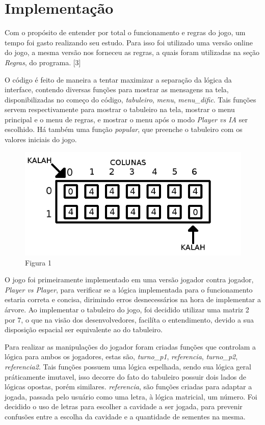 \documentclass[a4paper, 12pt]{article}
\begin{document}
		
	\section{Implementação}
		\textrm{Com o propósito de entender por total o funcionamento e regras do jogo, um tempo foi gasto realizando seu estudo. Para isso foi utilizado uma versão online do jogo, a mesma versão nos forneceu as regras, a quais foram utilizadas na seção \emph{Regras}, do programa. [3]}
		
		\textrm{O código é feito de maneira a tentar maximizar a separação da lógica da interface, contendo diversas funções para mostrar as mensagens na tela, disponibilizadas no começo do código, \emph{tabuleiro}, \emph{menu}, \emph{menu_dific}. Tais funções servem respectivamente para mostrar o tabuleiro na tela, mostrar o menu principal e o menu de regras, e mostrar o menu após o modo \emph{Player vs IA} ser escolhido. Há também uma função \emph{popular}, que preenche o tabuleiro com os valores iniciais do jogo.}

		\begin{figure}[H]
                \centering
                \includegraphics[scale=0.6]{Figura1.png}
                \caption{Figura 1}
        \end{figure}
		
		\textrm{O jogo foi primeiramente implementado em uma versão jogador contra jogador, \emph{Player vs Player}, para verificar se a lógica implementada para o funcionamento estaria correta e concisa, dirimindo erros desnecessários na hora de implementar a árvore. Ao implementar o tabuleiro do jogo, foi decidido utilizar uma matriz 2 por 7, o que na visão dos desenvolvedores, facilíta o entendimento, devido a sua disposição espacial ser equivalente ao do tabuleiro.}
		
		\textrm{Para realizar as manipulações do jogador foram criadas funções que controlam a lógica para ambos os jogadores, estas são, \emph{turno_p1}, \emph{referencia}, \emph{turno_p2}, \emph{referencia2}. Tais funções possuem uma lógica espelhada, sendo sua lógica geral práticamente imutavel, isso decorre do fato do tabuleiro possuir dois lados de lógicas opostas, porém similares. \emph{referencia}, são funções criadas para adaptar a jogada, passada pelo usuário como uma letra, à lógica matricial, um número. Foi decidido o uso de letras para escolher a cavidade a ser jogada, para prevenir confusões entre a escolha da cavidade e a quantidade de sementes na mesma.}
		
\end{document}
